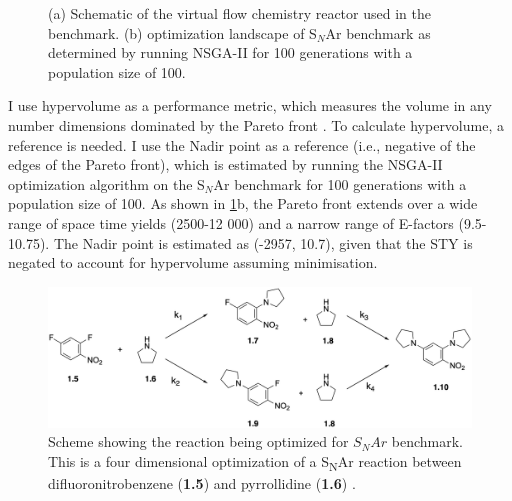 \begin{figure}
    \centering
    \caption{(a) Schematic of the virtual flow chemistry reactor used in the benchmark. (b) optimization landscape of S$_N$Ar benchmark as determined by running NSGA-II for 100 generations with a population size of 100.}
    \label{fig:snar}

\end{figure}

I use hypervolume as a performance metric, which measures the volume in any number dimensions dominated by the Pareto front \cite{Emmerich2016}. To calculate hypervolume, a reference is needed. I use the Nadir point as a reference (i.e., negative of the edges of the Pareto front), which is estimated by running the NSGA-II optimization algorithm \cite{Deb2002} on the S$_N$Ar benchmark for 100 generations with a population size of 100. As shown in \ref{fig:snar}b, the Pareto front  extends over a wide range of space time yields (2500-12 000) and a narrow range of E-factors (9.5-10.75). The Nadir point is estimated as (-2957, 10.7), given that the STY is negated to account for hypervolume assuming minimisation.

\begin{figure}
    \centering
    \includegraphics[width=\textwidth]{gfx/Chapter03/snar_benchmark_scheme_thesis.png}
    \caption{Scheme showing the reaction being optimized for $S_NAr$ benchmark. This is a four dimensional optimization of a  S\textsubscript{N}Ar reaction between difluoronitrobenzene (\textbf{1.5}) and pyrrollidine (\textbf{1.6}) \cite{Hone2017}.}
    \label{fig:snar_benchmark}
\end{figure}

